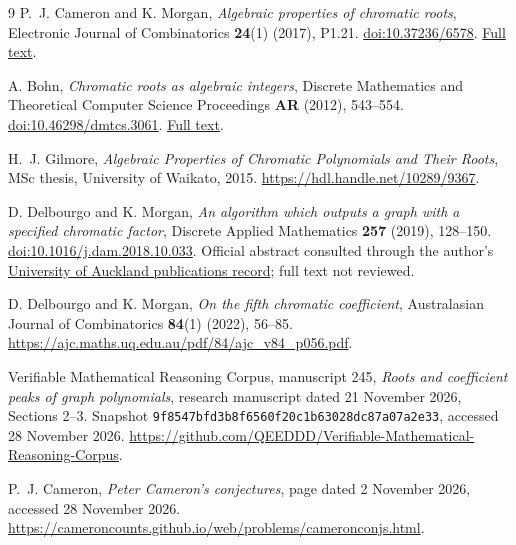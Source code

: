 \documentclass[11pt,a4paper]{article}
\theoremstyle{definition}
\begin{document}
\begin{thebibliography}{9}
P.~J. Cameron and K. Morgan,
\emph{Algebraic properties of chromatic roots},
Electronic Journal of Combinatorics \textbf{24}(1) (2017), P1.21.
\href{https://doi.org/10.37236/6578}{doi:10.37236/6578}.
\href{https://emis.de/ft/29131}{Full text}.

A. Bohn, \emph{Chromatic roots as algebraic integers},
Discrete Mathematics and Theoretical Computer Science Proceedings
\textbf{AR} (2012), 543--554.
\href{https://doi.org/10.46298/dmtcs.3061}{doi:10.46298/dmtcs.3061}.
\href{https://www.math.nagoya-u.ac.jp/fpsac12/download/contributed/dmAR0148.pdf}{Full text}.

H.~J. Gilmore,
\emph{Algebraic Properties of Chromatic Polynomials and Their Roots},
MSc thesis, University of Waikato, 2015.
\url{https://hdl.handle.net/10289/9367}.

D. Delbourgo and K. Morgan,
\emph{An algorithm which outputs a graph with a specified chromatic factor},
Discrete Applied Mathematics \textbf{257} (2019), 128--150.
\href{https://doi.org/10.1016/j.dam.2018.10.033}{doi:10.1016/j.dam.2018.10.033}.
Official abstract consulted through the author's
\href{https://profiles.auckland.ac.nz/daniel-delbourgo/publications}{University of Auckland publications record};
full text not reviewed.

D. Delbourgo and K. Morgan, \emph{On the fifth chromatic coefficient},
Australasian Journal of Combinatorics \textbf{84}(1) (2022), 56--85.
\url{https://ajc.maths.uq.edu.au/pdf/84/ajc_v84_p056.pdf}.

Verifiable Mathematical Reasoning Corpus, manuscript 245,
\emph{Roots and coefficient peaks of graph polynomials},
research manuscript dated 21 November 2026, Sections 2--3.
Snapshot \texttt{9f8547bfd3b8f6560f20c1b63028dc87a07a2e33},
accessed 28 November 2026.
\url{https://github.com/QEEDDD/Verifiable-Mathematical-Reasoning-Corpus}.

P.~J. Cameron, \emph{Peter Cameron's conjectures},
page dated 2 November 2026, accessed 28 November 2026.
\url{https://cameroncounts.github.io/web/problems/cameronconjs.html}.
\end{thebibliography}
\end{document}
